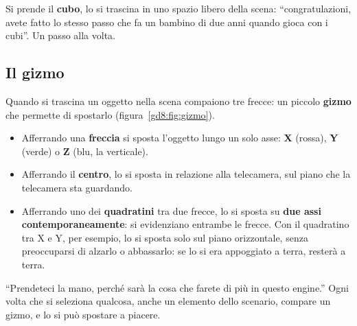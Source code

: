 Si prende il \textbf{cubo}, lo si trascina in uno spazio libero della scena:
``congratulazioni, avete fatto lo stesso passo che fa un bambino di due anni
quando gioca con i cubi''. Un passo alla volta.

\subsection{Il gizmo}

Quando si trascina un oggetto nella scena compaiono tre frecce: un piccolo
\textbf{gizmo} che permette di spostarlo (figura~\ref{gd8:fig:gizmo}).
\begin{itemize}
  \item Afferrando una \textbf{freccia} si sposta l'oggetto lungo un solo
        asse: \textbf{X} (rossa), \textbf{Y} (verde) o \textbf{Z} (blu, la
        verticale).
  \item Afferrando il \textbf{centro}, lo si sposta in relazione alla
        telecamera, sul piano che la telecamera sta guardando.
  \item Afferrando uno dei \textbf{quadratini} tra due frecce, lo si sposta
        su \textbf{due assi contemporaneamente}: si evidenziano entrambe le
        frecce. Con il quadratino tra X e Y, per esempio, lo si sposta solo
        sul piano orizzontale, senza preoccuparsi di alzarlo o abbassarlo:
        se lo si era appoggiato a terra, resterà a terra.
\end{itemize}
``Prendeteci la mano, perché sarà la cosa che farete di più in questo
engine.'' Ogni volta che si seleziona qualcosa, anche un elemento dello
scenario, compare un gizmo, e lo si può spostare a piacere.

